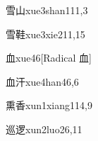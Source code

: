 \begin{verbete}{雪山}{xue3shan1}{11,3}
\end{verbete}

\begin{verbete}{雪鞋}{xue3xie2}{11,15}
\end{verbete}

\begin{verbete}{血}{xue4}{6}[Radical 血]
\end{verbete}

\begin{verbete}{血汗}{xue4han4}{6,6}
\end{verbete}

\begin{verbete}{熏香}{xun1xiang1}{14,9}
\end{verbete}

\begin{verbete}{巡逻}{xun2luo2}{6,11}
\end{verbete}

